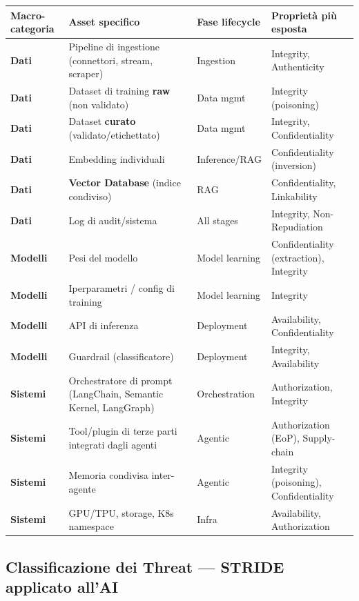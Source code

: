 \documentclass[11pt, a4paper]{article}
\begin{document}
\noindent
\begin{tabularx}{\textwidth}{|>{\bfseries}l|X|l|X|}
\hline
Macro-categoria & \textbf{Asset specifico} & \textbf{Fase lifecycle} & \textbf{Proprietà più esposta} \\ \hline
Dati & Pipeline di ingestione (connettori, stream, scraper) & Ingestion & Integrity, Authenticity \\ \hline
Dati & Dataset di training \textbf{raw} (non validato) & Data mgmt & Integrity (poisoning) \\ \hline
Dati & Dataset \textbf{curato} (validato/etichettato) & Data mgmt & Integrity, Confidentiality \\ \hline
Dati & Embedding individuali & Inference/RAG & Confidentiality (inversion) \\ \hline
Dati & \textbf{Vector Database} (indice condiviso) & RAG & Confidentiality, Linkability \\ \hline
Dati & Log di audit/sistema & All stages & Integrity, Non-Repudiation \\ \hline
Modelli & Pesi del modello & Model learning & Confidentiality (extraction), Integrity \\ \hline
Modelli & Iperparametri / config di training & Model learning & Integrity \\ \hline
Modelli & API di inferenza & Deployment & Availability, Confidentiality \\ \hline
Modelli & Guardrail (classificatore) & Deployment & Integrity, Availability \\ \hline
Sistemi & Orchestratore di prompt (LangChain, Semantic Kernel, LangGraph) & Orchestration & Authorization, Integrity \\ \hline
Sistemi & Tool/plugin di terze parti integrati dagli agenti & Agentic & Authorization (EoP), Supply-chain \\ \hline
Sistemi & Memoria condivisa inter-agente & Agentic & Integrity (poisoning), Confidentiality \\ \hline
Sistemi & GPU/TPU, storage, K8s namespace & Infra & Availability, Authorization \\ \hline
\end{tabularx}

\subsection{Classificazione dei Threat — STRIDE applicato all'AI}
\end{document}
